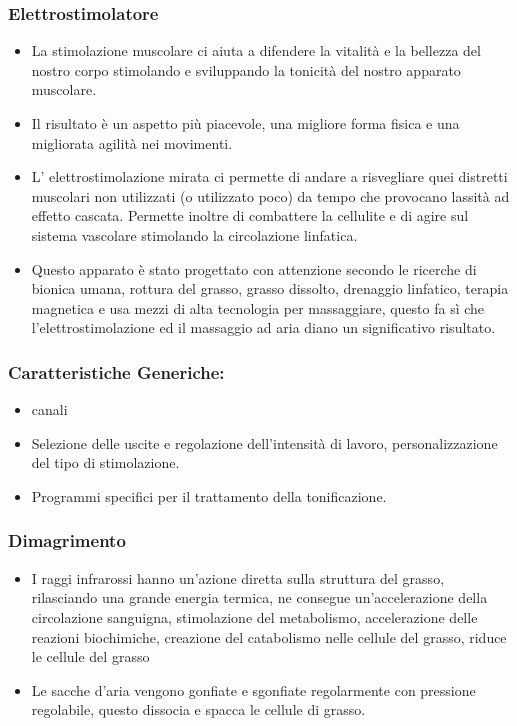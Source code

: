 \documentclass[a4paper]{article}
\begin{document}
\subsubsection{Elettrostimolatore}
\begin{itemize}
  \item La stimolazione muscolare ci aiuta a difendere la vitalità e la bellezza del nostro corpo stimolando e sviluppando la tonicità del nostro apparato muscolare.
  \item Il risultato è un aspetto più piacevole, una migliore forma fisica e una migliorata agilità nei movimenti.
  \item L' elettrostimolazione mirata ci permette di andare a risvegliare quei distretti muscolari non utilizzati (o utilizzato poco) da tempo che provocano lassità ad effetto cascata. Permette inoltre di combattere la cellulite e di agire sul sistema vascolare stimolando la circolazione linfatica.
  \item Questo apparato è stato progettato con attenzione secondo le ricerche di bionica umana, rottura del grasso, grasso dissolto, drenaggio linfatico, terapia magnetica e usa mezzi di alta tecnologia per massaggiare, questo fa sì che l'elettrostimolazione ed il massaggio ad aria diano un significativo risultato.
\end{itemize}

\subsubsection{Caratteristiche Generiche:}
\begin{itemize}
  \item canali
  \item Selezione delle uscite e regolazione dell'intensità di lavoro, personalizzazione del tipo di stimolazione.
  \item Programmi specifici per il trattamento della tonificazione.
\end{itemize}

\subsubsection{Dimagrimento}
\begin{itemize}
  \item I raggi infrarossi hanno un'azione diretta sulla struttura del grasso, rilasciando una grande energia termica, ne consegue un'accelerazione della circolazione sanguigna, stimolazione del metabolismo, accelerazione delle reazioni biochimiche, creazione del catabolismo nelle cellule del grasso, riduce le cellule del grasso
  \item Le sacche d'aria vengono gonfiate e sgonfiate regolarmente con pressione regolabile, questo dissocia e spacca le cellule di grasso.
\end{itemize}
\end{document}
